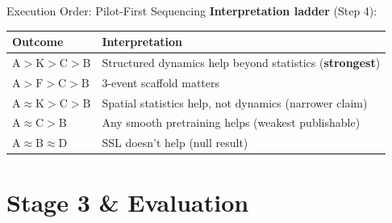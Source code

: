 \documentclass[aspectratio=169, 11pt]{beamer}
\begin{document}
\begin{frame}{Execution Order: Pilot-First Sequencing}
\vspace{0.3em}
\small
\textbf{Interpretation ladder} (Step 4):
\begin{center}
\scriptsize
\renewcommand{\arraystretch}{1.1}
\begin{tabular}{@{}l l@{}}
  \toprule
  \textbf{Outcome} & \textbf{Interpretation} \\
  \midrule
  $\text{A} > \text{K} > \text{C} > \text{B}$ & Structured dynamics help beyond statistics (\textbf{strongest}) \\
  $\text{A} > \text{F} > \text{C} > \text{B}$ & 3-event scaffold matters \\
  $\text{A} \approx \text{K} > \text{C} > \text{B}$ & Spatial statistics help, not dynamics (narrower claim) \\
  $\text{A} \approx \text{C} > \text{B}$ & Any smooth pretraining helps (weakest publishable) \\
  $\text{A} \approx \text{B} \approx \text{D}$ & SSL doesn't help (null result) \\
  \bottomrule
\end{tabular}
\end{center}
\end{frame}

\section{Stage 3 \& Evaluation}
\end{document}
